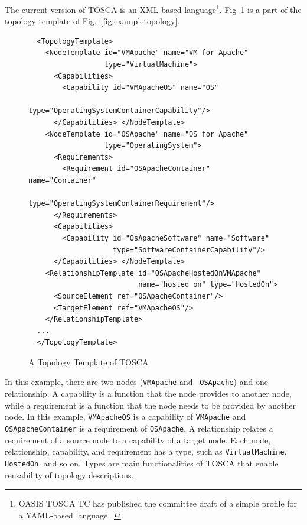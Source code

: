 \documentclass[12pt]{report}
\begin{document}
The current version of TOSCA is an XML-based language\footnote{OASIS
  TOSCA TC has published the committee draft of a simple profile for a
  YAML-based language.~\cite{TOSCAYAML}}. Fig~\ref{fig:topology} is a
part of the topology template of Fig.~\ref{fig:exampletopology}.
\begin{figure}
\centering
\small
\begin{verbatim}
  <TopologyTemplate>
    <NodeTemplate id="VMApache" name="VM for Apache" 
                  type="VirtualMachine">
      <Capabilities>
        <Capability id="VMApacheOS" name="OS" 
                    type="OperatingSystemContainerCapability"/>
      </Capabilities> </NodeTemplate>
    <NodeTemplate id="OSApache" name="OS for Apache" 
                  type="OperatingSystem">
      <Requirements>
        <Requirement id="OSApacheContainer" name="Container" 
                     type="OperatingSystemContainerRequirement"/>
      </Requirements>
      <Capabilities>
        <Capability id="OsApacheSoftware" name="Software" 
                    type="SoftwareContainerCapability"/>
      </Capabilities> </NodeTemplate>
    <RelationshipTemplate id="OSApacheHostedOnVMApache"
                          name="hosted on" type="HostedOn">
      <SourceElement ref="OSApacheContainer"/>
      <TargetElement ref="VMApacheOS"/>
    </RelationshipTemplate>
  ...
  </TopologyTemplate>
\end{verbatim}
\normalsize
\caption{A Topology Template of TOSCA}
\label{fig:topology}
\end{figure}
In this example, there are two nodes ({\tt VMApache} and {\tt
  OSApache}) and one relationship.  A capability is a function that
the node provides to another node, while a requirement is a function
that the node needs to be provided by another node. In this example,
{\tt VMApacheOS} is a capability of {\tt VMApache} and {\tt
  OSApacheContainer} is a requirement of {\tt OSApache}.  A
relationship relates a requirement of a source node to a capability of
a target node.  Each node, relationship, capability, and requirement
has a type, such as {\tt VirtualMachine}, {\tt HostedOn}, and so
on. Types are main functionalities of TOSCA that enable reusability of
topology descriptions.
\end{document}
